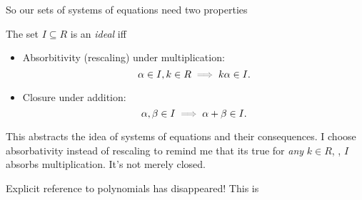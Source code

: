 \documentclass[a5paper]{scrartcl}
\let\oldimplies\implies
\def\implies{\color{gray}\oldimplies\color{black}}
\theoremstyle{nonumberplain}
\begin{document}
So our sets of systems of equations need two properties
\begin{defn}[Ideal]
  The set \(I\subseteq R\) is an \emph{ideal} iff
  \begin{itemize}
    \item Absorbitivity (rescaling) under multiplication:
          \[
          \alpha \in I, k\in R \implies k\alpha \in I.
          \]
    \item Closure under addition:
          \[
          \alpha, \beta\in I \implies  \alpha+\beta \in I.
          \]
  \end{itemize}
  This abstracts the idea of systems of equations and their consequences. I choose absorbativity instead of rescaling to remind me that its true for \emph{any} \(k\in R\), \ie, \(I\) absorbs multiplication. It's not merely closed.
\end{defn}
Explicit reference to polynomials has disappeared! This is
\end{document}
